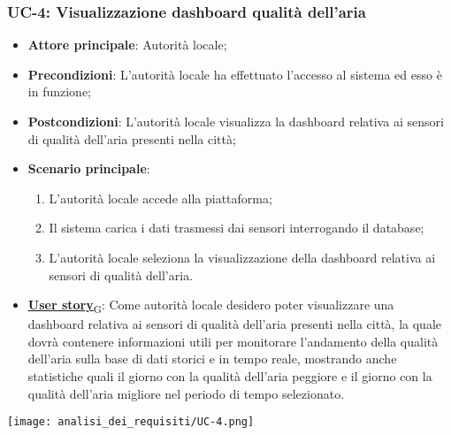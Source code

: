 \subsubsection{UC-4: Visualizzazione dashboard qualità dell'aria}
\begin{itemize}
	\item \textbf{Attore principale}: Autorità locale;
	\item \textbf{Precondizioni}: L'autorità locale ha effettuato l'accesso al sistema ed esso è in funzione;
	\item \textbf{Postcondizioni}: L'autorità locale visualizza la dashboard relativa
	      ai sensori di qualità dell'aria presenti nella città;
	\item \textbf{Scenario principale}:
	      \begin{enumerate}
		      \item L'autorità locale accede alla piattaforma;
		      \item Il sistema carica i dati trasmessi dai sensori interrogando il database;
		      \item L'autorità locale seleziona la visualizzazione della dashboard relativa ai sensori di qualità dell'aria.
	      \end{enumerate}
	\item \href{https://7last.github.io/docs/rtb/documentazione-interna/glossario\#user-story}{\textbf{User story}\textsubscript{G}}:
	      Come autorità locale desidero poter visualizzare una dashboard relativa ai sensori di qualità dell'aria presenti nella città, la quale
	      dovrà contenere informazioni utili per monitorare l'andamento della qualità dell'aria sulla base di dati storici e in tempo reale, mostrando
	      anche statistiche quali il giorno con la qualità dell'aria peggiore e il giorno con la qualità dell'aria migliore nel periodo di tempo selezionato.
\end{itemize}
\begin{center}
	\texttt{[image: analisi\_dei\_requisiti/UC-4.png]}
\end{center}

